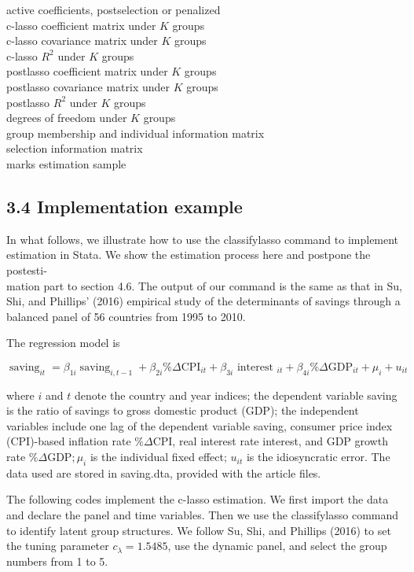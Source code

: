 \documentclass[10pt]{article}
\begin{document}
active coefficients, postselection or penalized\\
c-lasso coefficient matrix under $K$ groups\\
c-lasso covariance matrix under $K$ groups\\
c-lasso $R^{2}$ under $K$ groups\\
postlasso coefficient matrix under $K$ groups\\
postlasso covariance matrix under $K$ groups\\
postlasso $R^{2}$ under $K$ groups\\
degrees of freedom under $K$ groups\\
group membership and individual information matrix\\
selection information matrix\\
marks estimation sample

\subsection*{3.4 Implementation example}
In what follows, we illustrate how to use the classifylasso command to implement estimation in Stata. We show the estimation process here and postpone the postesti-\\
mation part to section 4.6. The output of our command is the same as that in Su, Shi, and Phillips' (2016) empirical study of the determinants of savings through a balanced panel of 56 countries from 1995 to 2010.

The regression model is

$$
\operatorname{saving}_{i t}=\beta_{1 i} \operatorname{saving}_{i, t-1}+\beta_{2 i} \% \Delta \mathrm{CPI}_{i t}+\beta_{3 i} \text { interest }_{i t}+\beta_{4 i} \% \Delta \mathrm{GDP}_{i t}+\mu_{i}+u_{i t}
$$

where $i$ and $t$ denote the country and year indices; the dependent variable saving is the ratio of savings to gross domestic product (GDP); the independent variables include one lag of the dependent variable saving, consumer price index (CPI)-based inflation rate $\% \Delta \mathrm{CPI}$, real interest rate interest, and GDP growth rate $\% \Delta \mathrm{GDP} ; \mu_{i}$ is the individual fixed effect; $u_{i t}$ is the idiosyncratic error. The data used are stored in saving.dta, provided with the article files.

The following codes implement the c-lasso estimation. We first import the data and declare the panel and time variables. Then we use the classifylasso command to identify latent group structures. We follow Su, Shi, and Phillips (2016) to set the tuning parameter $c_{\lambda}=1.5485$, use the dynamic panel, and select the group numbers from 1 to 5.
\end{document}
